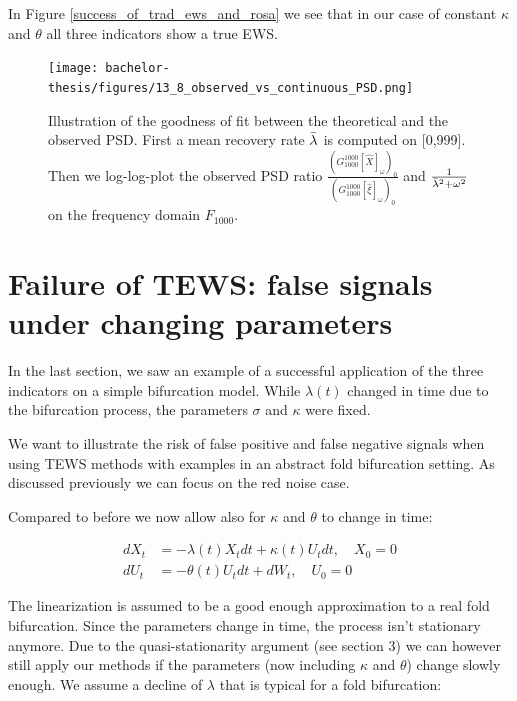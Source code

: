 \documentclass[%
thesis=student,%
coverpage=false,%
titlepage=false,%
headmarks=true, %
english,%
font=libertine, %
math=newpxtx, %
BCOR=5mm,%
coverBCOR=11mm%
]{tumbook}
\begin{document}
In Figure \ref{success_of_trad_ews_and_rosa} we see that in our case of constant $\kappa$ and $\theta$ all three indicators show a true EWS.


\begin{figure}
    \centering
    \texttt{[image: bachelor-thesis/figures/13\_8\_observed\_vs\_continuous\_PSD.png]}
    \caption{Illustration of the goodness of fit between the theoretical and the observed PSD.  First a mean recovery rate $\Bar{\lambda}$ is computed on [0,999]. Then we log-log-plot the observed PSD ratio $\frac{(G_{1000}^{1000}[\widehat{X}]_{\omega})_{0}}{(G_{1000}^{1000}[\widehat{\xi}]_{\omega})_{0}}$ and $\frac{1}{\Bar{\lambda}^2 + \omega^2}$ on the frequency domain $F_{1000}$.}
    \label{observed_vs_continuous_PSD}
\end{figure}

\chapter{Failure of TEWS: false signals  under changing parameters}

In the last section, we saw an example of a successful application of the three indicators on a simple bifurcation model. While $\lambda(t)$ changed in time due to the bifurcation process, the parameters $\sigma$ and $\kappa$ were fixed. 

We want to illustrate the risk of false positive and false negative signals when using TEWS methods with examples in an abstract fold bifurcation setting. As discussed previously we can focus on the red noise case.

Compared to before we now allow also for $\kappa$ and $\theta$ to change in time:

    \begin{equation}
    \begin{aligned}
        dX_{t} &= -\lambda(t) X_{t}dt + \kappa(t) U_{t}dt, \quad X_{0} = 0 \\
        dU_{t} &= -\theta(t) U_{t}dt + dW_{t}, \quad U_{0} = 0
    \end{aligned}
    \label{failure of TEWS SDE}
    \end{equation}

The linearization is assumed to be a good enough approximation to a real fold bifurcation. Since the parameters change in time, the process isn't stationary anymore. Due to the quasi-stationarity argument (see section 3) we can however still apply our methods if the parameters (now including $\kappa$ and $\theta$) change slowly enough.
We assume a decline of $\lambda$ that is typical for a fold bifurcation: 
\end{document}
